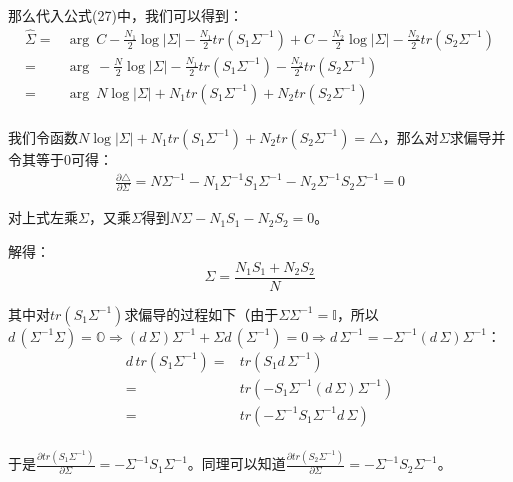 \documentclass[a4paper]{article}
\begin{document}
那么代入公式(27)中，我们可以得到：
\begin{equation}
    \begin{split}
        \hat{\Sigma} 
        = & \mathop{\arg\max_{\Sigma}}\ C - \frac{N_1}{2} \log |\Sigma| -\frac{N_1}{2}tr(S_1\Sigma^{-1}) + C - \frac{N_2}{2} \log |\Sigma| -\frac{N_2}{2}tr(S_2\Sigma^{-1}) \\
        = & \mathop{\arg\max_{\Sigma}}\  - \frac{N}{2}  \log |\Sigma| -\frac{N_1}{2}tr(S_1\Sigma^{-1}) -\frac{N_2}{2}tr(S_2\Sigma^{-1}) \\
        = & \mathop{\arg\min_{\Sigma}}\  N  \log |\Sigma| + N_1tr(S_1\Sigma^{-1}) +N_2tr(S_2\Sigma^{-1}) \\
    \end{split}
\end{equation}

我们令函数$  N  \log |\Sigma| + N_1tr(S_1\Sigma^{-1}) +N_2tr(S_2\Sigma^{-1}) = \triangle$，那么对$\Sigma$求偏导并令其等于0可得：
\begin{equation}
    \begin{split}
         \frac{\partial \triangle}{\partial \Sigma} =  N \Sigma^{-1} - N_1\Sigma^{-1}S_1\Sigma^{-1} - N_2\Sigma^{-1}S_2\Sigma^{-1}  = 0 
    \end{split}
\end{equation}

对上式左乘$\Sigma$，又乘$\Sigma$得到$N \Sigma - N_1S_1 - N_2S_2 = 0 $。

解得：
\begin{equation}
    \Sigma = \frac{N_1S_1 + N_2S_2}{N}
\end{equation}

其中对$tr(S_1\Sigma^{-1})$求偏导的过程如下（由于$\Sigma\Sigma^{-1}=\mathbb{I}$，所以$d\, (\Sigma^{-1}\Sigma)=\mathbb{O}\Rightarrow (d\,\Sigma)\Sigma^{-1}+\Sigma d\,(\Sigma^{-1})=0
\Rightarrow d\,\Sigma^{-1} = -\Sigma^{-1}(d\,\Sigma)\Sigma^{-1}$：
\begin{equation}
    \begin{split}
        d \,tr(S_1\Sigma^{-1})= & tr(S_1d\,\Sigma^{-1}) \\
        = & tr(-S_1\Sigma^{-1}(d\,\Sigma)\Sigma^{-1})\\
        = & tr(-\Sigma^{-1}S_1\Sigma^{-1}d\,\Sigma)\\
    \end{split}
\end{equation}

于是$\frac{\partial tr(S_1\Sigma^{-1})}{\partial \Sigma}=-\Sigma^{-1}S_1\Sigma^{-1}$。同理可以知道$\frac{\partial tr(S_2\Sigma^{-1})}{\partial \Sigma}=-\Sigma^{-1}S_2\Sigma^{-1}$。
\end{document}

